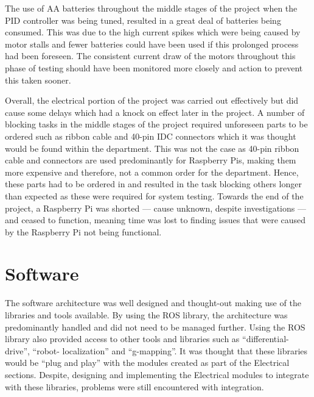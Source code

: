 The use of AA batteries throughout the middle stages of the project when the PID 
controller was being tuned, resulted in a great deal of batteries being consumed. 
This was due to the high current spikes which were being caused by motor stalls and 
fewer batteries could have been used if this prolonged process had been foreseen. The 
consistent current draw of the motors throughout this phase of testing should have 
been monitored more closely and action to prevent this taken sooner.   

Overall, the electrical portion of the project was carried out effectively but did 
cause some delays which had a knock on effect later in the project. A number of 
blocking tasks in the middle stages of the project required unforeseen parts to be 
ordered such as ribbon cable and 40-pin IDC connectors which it was thought would 
be found within the department. This was not the case as 40-pin ribbon cable and 
connectors are used predominantly for Raspberry Pis, making them more expensive 
and therefore, not a common order for the department. Hence, these parts had to be ordered in and resulted in the task blocking 
others longer than expected as these were required for system testing. Towards the end of the project, a Raspberry Pi was 
shorted --- cause unknown, despite investigations --- and ceased to function, 
meaning time was lost to finding issues that were caused by the Raspberry Pi not 
being functional.    
 
\section{Software}\label{eval/soft}
The software architecture was well designed and thought-out making use of the 
libraries and tools available. By using the ROS library, the architecture was predominantly handled
and did not need to be managed further. Using the ROS library also provided 
access to other tools and libraries such as ``differential-drive'', ``robot-
localization'' and ``g-mapping''. It was thought that these libraries would be ``plug 
and play'' with the modules created as part of the Electrical sections. Despite, 
designing and implementing the Electrical modules to integrate with these libraries, 
problems were still encountered with integration. 

